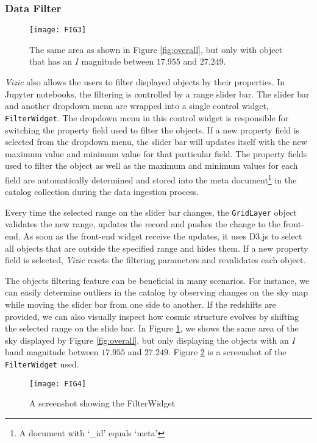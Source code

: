 \documentclass[../vis.tex]{subfiles}
\begin{document}
\subsubsection{Data Filter}
\label{filter}
\begin{figure}[h]
\centering
\texttt{[image: FIG3]}
\caption{The same area as shown in Figure \ref{fig:overall}, but only with object that has an $I$ magnitude \citep{sdss_filter} between $17.955$ and $27.249$.}
\label{fig:filtered}
\end{figure}
\textit{Vizic} also allows the users to filter displayed objects by their properties. In Jupyter notebooks, the filtering is controlled by a range slider bar.
The slider bar and another dropdown menu are wrapped into a single control widget, \texttt{FilterWidget}.
The dropdown menu in this control widget is responsible for switching the property field used to filter the objects. If a new property field is selected from the dropdown menu, the slider bar will updates itself with the new maximum value and minimum value for that particular field.
The property fields used to filter the object as well as the maximum and minimum values for each field are automatically determined and stored into the meta document\footnote{A document with `\_id' equals `meta'} in the catalog collection during the data ingestion process.

Every time the selected range on the slider bar changes, the \texttt{GridLayer} object validates the new range, updates the record and pushes the change to the front-end. As soon as the front-end widget receive the updates, it uses D3.js to select all objects that are outside the specified range and hides them. If a new property field is selected, \textit{Vizic} resets the filtering parameters and revalidates each object.

The objects filtering feature can be beneficial in many scenarios. For instance, we can easily determine outliers in the catalog by observing changes on the sky map while moving the slider bar from one side to another.
If the redshifts are provided, we can also visually inspect how cosmic structure evolves by shifting the selected range on the slide bar.
In Figure \ref{fig:filtered}, we shows the same area of the sky displayed by Figure \ref{fig:overall}, but only displaying the objects with an $I$ band magnitude between $17.955$ and $27.249$. Figure \ref{fig:slider} is a screenshot of the \texttt{FilterWidget} used.

\begin{figure}[h]
\centering
\texttt{[image: FIG4]}
\caption{A screenshot showing the FilterWidget}
\label{fig:slider}
\end{figure}
\end{document}

